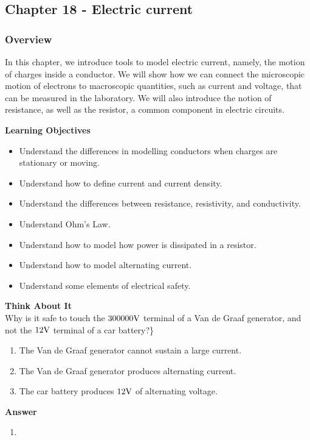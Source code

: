\subsection{Chapter 18 - Electric current}

\subsubsection{Overview}\label{chapter:current}

In this chapter, we introduce tools to model electric current, namely, the motion of charges inside a conductor. We will show how we can connect the microscopic motion of electrons to macroscopic quantities, such as current and voltage, that can be measured in the laboratory. We will also introduce the notion of resistance, as well as the resistor, a common component in electric circuits.

\begin{framed}
\textbf{Learning Objectives}\\
\begin{itemize}
\item Understand the differences in modelling conductors when charges are stationary or moving.
\item Understand how to define current and current density.
\item Understand the differences between resistance, resistivity, and conductivity.
\item Understand Ohm's Law.
\item Understand how to model how power is dissipated in a resistor.
\item Understand how to model alternating current.
\item Understand some elements of electrical safety.
\end{itemize}
\end{framed}

\begin{framed}
\textbf{Think About It}\\
Why is it safe to touch the $300000 {\rm V}$ terminal of a Van de Graaf generator, and not the $12 {\rm V}$ terminal of a car battery?\}

\begin{enumerate}
\item The Van de Graaf generator cannot sustain a large current.
\item The Van de Graaf generator produces alternating current.
\item The car battery produces $12 {\rm V}$ of alternating voltage.
\end{enumerate}

\begin{framed}
\textbf{Answer}\\
\begin{enumerate}
\item
\end{enumerate}
\end{framed}
\end{framed}

